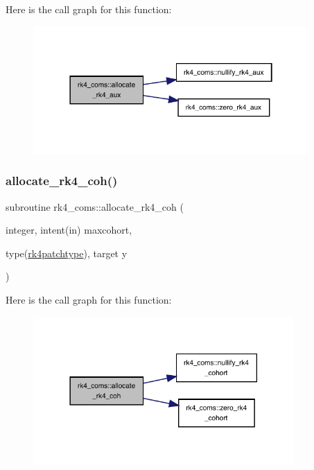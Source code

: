 Here is the call graph for this function\+:
\nopagebreak
\begin{figure}[H]
\begin{center}
\leavevmode
\includegraphics[width=298pt]{namespacerk4__coms_afe1de3958c4ca4c64d5fb2160fced95f_cgraph}
\end{center}
\end{figure}
\mbox{\label{namespacerk4__coms_ac355c3cf81ffef1c269338cf8b07c4bc}} 
\subsubsection{\texorpdfstring{allocate\+\_\+rk4\+\_\+coh()}{allocate\_rk4\_coh()}}
{\footnotesize\ttfamily subroutine rk4\+\_\+coms\+::allocate\+\_\+rk4\+\_\+coh (\begin{DoxyParamCaption}\item[{integer, intent(in)}]{maxcohort,  }\item[{type(\hyperlink{structrk4__coms_1_1rk4patchtype}{rk4patchtype}), target}]{y }\end{DoxyParamCaption})}

Here is the call graph for this function\+:
\nopagebreak
\begin{figure}[H]
\begin{center}
\leavevmode
\includegraphics[width=282pt]{namespacerk4__coms_ac355c3cf81ffef1c269338cf8b07c4bc_cgraph}
\end{center}
\end{figure}
\mbox{\label{namespacerk4__coms_a52256ca0348235c95a467581d6067dac}} 
